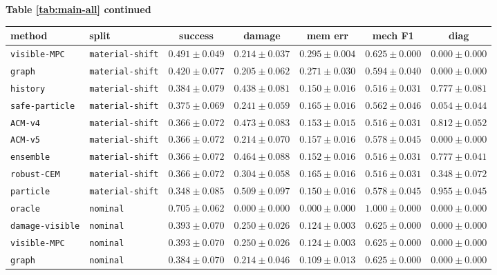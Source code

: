 \documentclass{article}
\begin{document}
\begin{center}
\textbf{Table \ref{tab:main-all} continued}\\[0.4ex]
\begin{tabular}{llccccc}
\toprule
method & split & success & damage & mem err & mech F1 & diag \\
\midrule
\texttt{visible-MPC} & \texttt{material-shift} & $0.491 \pm 0.049$ & $0.214 \pm 0.037$ & $0.295 \pm 0.004$ & $0.625 \pm 0.000$ & $0.000 \pm 0.000$ \\
\texttt{graph} & \texttt{material-shift} & $0.420 \pm 0.077$ & $0.205 \pm 0.062$ & $0.271 \pm 0.030$ & $0.594 \pm 0.040$ & $0.000 \pm 0.000$ \\
\texttt{history} & \texttt{material-shift} & $0.384 \pm 0.079$ & $0.438 \pm 0.081$ & $0.150 \pm 0.016$ & $0.516 \pm 0.031$ & $0.777 \pm 0.081$ \\
\texttt{safe-particle} & \texttt{material-shift} & $0.375 \pm 0.069$ & $0.241 \pm 0.059$ & $0.165 \pm 0.016$ & $0.562 \pm 0.046$ & $0.054 \pm 0.044$ \\
\texttt{ACM-v4} & \texttt{material-shift} & $0.366 \pm 0.072$ & $0.473 \pm 0.083$ & $0.153 \pm 0.015$ & $0.516 \pm 0.031$ & $0.812 \pm 0.052$ \\
\texttt{ACM-v5} & \texttt{material-shift} & $0.366 \pm 0.072$ & $0.214 \pm 0.070$ & $0.157 \pm 0.016$ & $0.578 \pm 0.045$ & $0.000 \pm 0.000$ \\
\texttt{ensemble} & \texttt{material-shift} & $0.366 \pm 0.072$ & $0.464 \pm 0.088$ & $0.152 \pm 0.016$ & $0.516 \pm 0.031$ & $0.777 \pm 0.041$ \\
\texttt{robust-CEM} & \texttt{material-shift} & $0.366 \pm 0.072$ & $0.304 \pm 0.058$ & $0.165 \pm 0.016$ & $0.516 \pm 0.031$ & $0.348 \pm 0.072$ \\
\texttt{particle} & \texttt{material-shift} & $0.348 \pm 0.085$ & $0.509 \pm 0.097$ & $0.150 \pm 0.016$ & $0.578 \pm 0.045$ & $0.955 \pm 0.045$ \\
\texttt{oracle} & \texttt{nominal} & $0.705 \pm 0.062$ & $0.000 \pm 0.000$ & $0.000 \pm 0.000$ & $1.000 \pm 0.000$ & $0.000 \pm 0.000$ \\
\texttt{damage-visible} & \texttt{nominal} & $0.393 \pm 0.070$ & $0.250 \pm 0.026$ & $0.124 \pm 0.003$ & $0.625 \pm 0.000$ & $0.000 \pm 0.000$ \\
\texttt{visible-MPC} & \texttt{nominal} & $0.393 \pm 0.070$ & $0.250 \pm 0.026$ & $0.124 \pm 0.003$ & $0.625 \pm 0.000$ & $0.000 \pm 0.000$ \\
\texttt{graph} & \texttt{nominal} & $0.384 \pm 0.070$ & $0.214 \pm 0.046$ & $0.109 \pm 0.013$ & $0.625 \pm 0.000$ & $0.000 \pm 0.000$ \\

\end{tabular}
\end{center}
\end{document}
